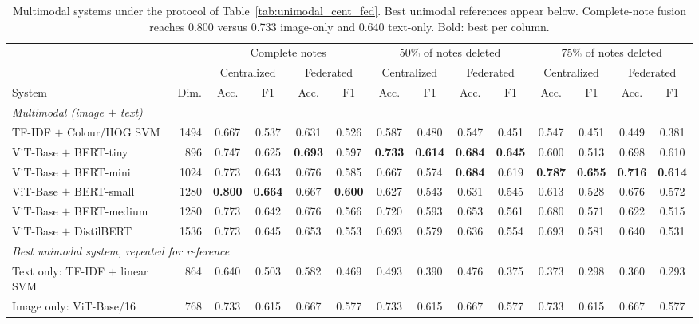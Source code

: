\documentclass[conference]{IEEEtran}
\begin{document}
\begin{table}[t]
\caption{Multimodal systems under the protocol of Table~\ref{tab:unimodal_cent_fed}. Best unimodal references appear below. Complete-note fusion reaches 0.800 versus 0.733 image-only and 0.640 text-only. Bold: best per column.}
\label{tab:multimodal_cent_fed}
\centering\footnotesize
\setlength\tabcolsep{4pt}
\begin{tabular}{lrcccccccccccc}
\toprule
 &  & \multicolumn{4}{c}{Complete notes} & \multicolumn{4}{c}{50\% of notes deleted} & \multicolumn{4}{c}{75\% of notes deleted}\\
\cmidrule(lr){3-6}\cmidrule(lr){7-10}\cmidrule(lr){11-14}
 &  & \multicolumn{2}{c}{Centralized} & \multicolumn{2}{c}{Federated} & \multicolumn{2}{c}{Centralized} & \multicolumn{2}{c}{Federated} & \multicolumn{2}{c}{Centralized} & \multicolumn{2}{c}{Federated}\\
\cmidrule(lr){3-4}\cmidrule(lr){5-6}\cmidrule(lr){7-8}\cmidrule(lr){9-10}\cmidrule(lr){11-12}\cmidrule(lr){13-14}
System & Dim. & Acc. & F1 & Acc. & F1 & Acc. & F1 & Acc. & F1 & Acc. & F1 & Acc. & F1\\
\midrule
\multicolumn{14}{l}{\emph{Multimodal (image $+$ text)}}\\
TF-IDF $+$ Colour/HOG SVM & 1494 & 0.667 & 0.537 & 0.631 & 0.526 & 0.587 & 0.480 & 0.547 & 0.451 & 0.547 & 0.451 & 0.449 & 0.381\\
ViT-Base $+$ BERT-tiny & 896 & 0.747 & 0.625 & \textbf{0.693} & 0.597 & \textbf{0.733} & \textbf{0.614} & \textbf{0.684} & \textbf{0.645} & 0.600 & 0.513 & 0.698 & 0.610\\
ViT-Base $+$ BERT-mini & 1024 & 0.773 & 0.643 & 0.676 & 0.585 & 0.667 & 0.574 & \textbf{0.684} & 0.619 & \textbf{0.787} & \textbf{0.655} & \textbf{0.716} & \textbf{0.614}\\
ViT-Base $+$ BERT-small & 1280 & \textbf{0.800} & \textbf{0.664} & 0.667 & \textbf{0.600} & 0.627 & 0.543 & 0.631 & 0.545 & 0.613 & 0.528 & 0.676 & 0.572\\
ViT-Base $+$ BERT-medium & 1280 & 0.773 & 0.642 & 0.676 & 0.566 & 0.720 & 0.593 & 0.653 & 0.561 & 0.680 & 0.571 & 0.622 & 0.515\\
ViT-Base $+$ DistilBERT & 1536 & 0.773 & 0.645 & 0.653 & 0.553 & 0.693 & 0.579 & 0.636 & 0.554 & 0.693 & 0.581 & 0.640 & 0.531\\
\midrule
\multicolumn{14}{l}{\emph{Best unimodal system, repeated for reference}}\\
Text only: TF-IDF $+$ linear SVM & 864 & 0.640 & 0.503 & 0.582 & 0.469 & 0.493 & 0.390 & 0.476 & 0.375 & 0.373 & 0.298 & 0.360 & 0.293\\
Image only: ViT-Base/16 & 768 & 0.733 & 0.615 & 0.667 & 0.577 & 0.733 & 0.615 & 0.667 & 0.577 & 0.733 & 0.615 & 0.667 & 0.577\\
\bottomrule
\end{tabular}
\end{table}
\end{document}
